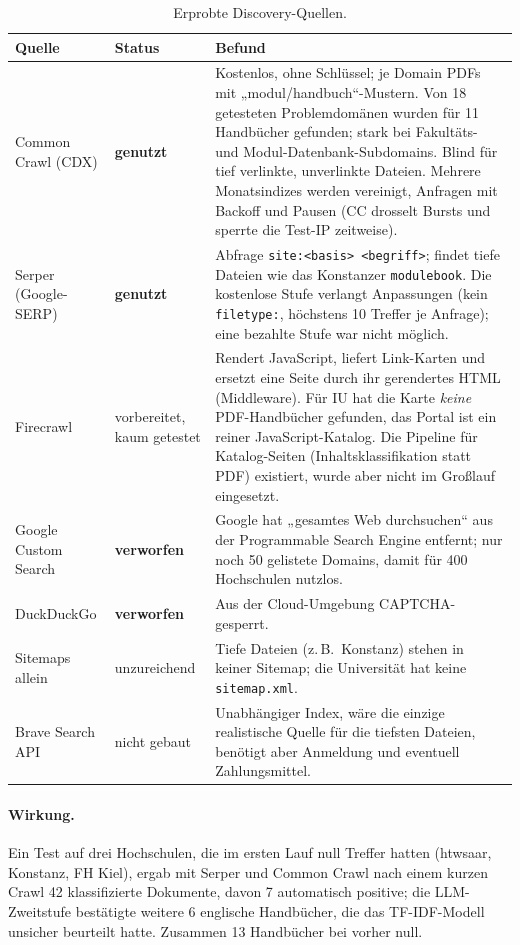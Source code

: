 \begin{table}[htbp]
\centering\small
\caption{Erprobte Discovery-Quellen.}\label{tab:discovery}
\begin{tabularx}{\linewidth}{@{}l l X@{}}
\toprule
\textbf{Quelle} & \textbf{Status} & \textbf{Befund} \\
\midrule
Common Crawl (CDX) & \textbf{genutzt} & Kostenlos, ohne Schlüssel; je Domain PDFs mit „modul/handbuch“-Mustern. Von 18 getesteten Problemdomänen wurden für 11 Handbücher gefunden; stark bei Fakultäts- und Modul-Datenbank-Subdomains. Blind für tief verlinkte, unverlinkte Dateien. Mehrere Monatsindizes werden vereinigt, Anfragen mit Backoff und Pausen (CC drosselt Bursts und sperrte die Test-IP zeitweise). \\
Serper (Google-SERP) & \textbf{genutzt} & Abfrage \texttt{site:<basis> <begriff>}; findet tiefe Dateien wie das Konstanzer \texttt{modulebook}. Die kostenlose Stufe verlangt Anpassungen (kein \texttt{filetype:}, höchstens 10 Treffer je Anfrage); eine bezahlte Stufe war nicht möglich. \\
Firecrawl & vorbereitet, kaum getestet & Rendert JavaScript, liefert Link-Karten und ersetzt eine Seite durch ihr gerendertes HTML (Middleware). Für IU hat die Karte \emph{keine} PDF-Handbücher gefunden, das Portal ist ein reiner JavaScript-Katalog. Die Pipeline für Katalog-Seiten (Inhaltsklassifikation statt PDF) existiert, wurde aber nicht im Großlauf eingesetzt. \\
\textcolor{orange!80!black}{Google Custom Search} & \textbf{verworfen} & Google hat „gesamtes Web durchsuchen“ aus der Programmable Search Engine entfernt; nur noch 50 gelistete Domains, damit für 400 Hochschulen nutzlos. \\
\textcolor{orange!80!black}{DuckDuckGo} & \textbf{verworfen} & Aus der Cloud-Umgebung CAPTCHA-gesperrt. \\
\textcolor{orange!80!black}{Sitemaps allein} & unzureichend & Tiefe Dateien (z.\,B.\ Konstanz) stehen in keiner Sitemap; die Universität hat keine \texttt{sitemap.xml}. \\
Brave Search API & nicht gebaut & Unabhängiger Index, wäre die einzige realistische Quelle für die tiefsten Dateien, benötigt aber Anmeldung und eventuell Zahlungsmittel. \\
\bottomrule
\end{tabularx}
\end{table}

\paragraph{Wirkung.} Ein Test auf drei Hochschulen, die im ersten Lauf null Treffer hatten (htwsaar, Konstanz, FH Kiel), ergab mit Serper und Common Crawl nach einem kurzen Crawl 42 klassifizierte Dokumente, davon 7 automatisch positive; die LLM-Zweitstufe bestätigte weitere 6 englische Handbücher, die das TF-IDF-Modell unsicher beurteilt hatte. Zusammen 13 Handbücher bei vorher null.

